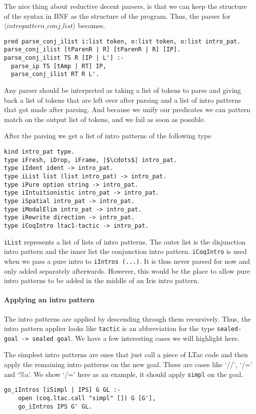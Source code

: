 \documentclass[thesis.tex]{subfiles}
\begin{document}
{{The nice thing about reductive decent parsers, is that we can keep the structure of the syntax in BNF as the structure of the program. Thus, the parser for $\langle intropattern\_conj\_list\rangle$ becomes.
\begin{verbatim}
pred parse_conj_ilist i:list token, o:list token, o:list intro_pat.
parse_conj_ilist [tParenR | R] [tParenR | R] [IP].
parse_conj_ilist TS R [IP | L'] :-
  parse_ip TS [tAmp | RT] IP,
  parse_conj_ilist RT R L'.
\end{verbatim}
Any parser should be interpreted as taking a list of tokens to parse and giving back a list of tokens that are left over after parsing and a list of intro patterns that got made after parsing. And because we unify our predicates we can pattern match on the output list of tokens, and we fail as soon as possible.

After the parsing we get a list of intro patterns of the following type
\begin{verbatim}
kind intro_pat type.
type iFresh, iDrop, iFrame, |$\cdots$| intro_pat.
type iIdent ident -> intro_pat.
type iList list (list intro_pat) -> intro_pat.
type iPure option string -> intro_pat.
type iIntuitionistic intro_pat -> intro_pat.
type iSpatial intro_pat -> intro_pat.
type iModalElim intro_pat -> intro_pat.
type iRewrite direction -> intro_pat.
type iCoqIntro ltac1-tactic -> intro_pat.
\end{verbatim}
\texttt{iList} represents a list of lists of intro patterns. The outer list is the disjunction intro pattern and the inner list the conjunction intro pattern. \texttt{iCoqIntro} is used when we pass a pure intro to \texttt{iIntros (...)}. It is thus never parsed for now and only added separately afterwards. However, this would be the place to allow pure intro patterns to be added in the middle of an Iris intro pattern.

\paragraph*{Applying an intro pattern}
The intro patterns are applied by descending through them recursively. Thus, the intro pattern applier looks like  \texttt{tactic} is an abbreviation for the type \texttt{sealed-goal -> sealed goal}. We have a few interesting cases we will highlight here.

The simplest intro patterns are ones that just call a piece of LTac code and then apply the remaining intro patterns on the new goal. These are cases like `//', `/=' and `\%a'. We show `/=' here as an example, it should apply \texttt{simpl} on the goal.
\begin{verbatim}
go_iIntros [iSimpl | IPS] G GL :-
    open (coq.ltac.call "simpl" []) G [G'],
    go_iIntros IPS G' GL.
\end{verbatim}

}}
\end{document}
